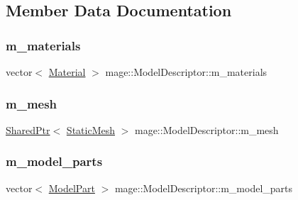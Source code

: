 \subsection{Member Data Documentation}
\hypertarget{classmage_1_1_model_descriptor_a672238b257f99836243d84f634ffeea2}{}\label{classmage_1_1_model_descriptor_a672238b257f99836243d84f634ffeea2} 
\subsubsection{\texorpdfstring{m\+\_\+materials}{m\_materials}}
{\footnotesize\ttfamily vector$<$ \hyperlink{structmage_1_1_material}{Material} $>$ mage\+::\+Model\+Descriptor\+::m\+\_\+materials\hspace{0.3cm}{\ttfamily [private]}}

\hypertarget{classmage_1_1_model_descriptor_ac3935d5b0738860809a770403ed07480}{}\label{classmage_1_1_model_descriptor_ac3935d5b0738860809a770403ed07480} 
\subsubsection{\texorpdfstring{m\+\_\+mesh}{m\_mesh}}
{\footnotesize\ttfamily \hyperlink{namespacemage_a1e01ae66713838a7a67d30e44c67703e}{Shared\+Ptr}$<$ \hyperlink{classmage_1_1_static_mesh}{Static\+Mesh} $>$ mage\+::\+Model\+Descriptor\+::m\+\_\+mesh\hspace{0.3cm}{\ttfamily [private]}}

\hypertarget{classmage_1_1_model_descriptor_a200c6e44c9b6a5bde5c8490fb93ba00f}{}\label{classmage_1_1_model_descriptor_a200c6e44c9b6a5bde5c8490fb93ba00f} 
\subsubsection{\texorpdfstring{m\+\_\+model\+\_\+parts}{m\_model\_parts}}
{\footnotesize\ttfamily vector$<$ \hyperlink{structmage_1_1_model_part}{Model\+Part} $>$ mage\+::\+Model\+Descriptor\+::m\+\_\+model\+\_\+parts\hspace{0.3cm}{\ttfamily [private]}}

